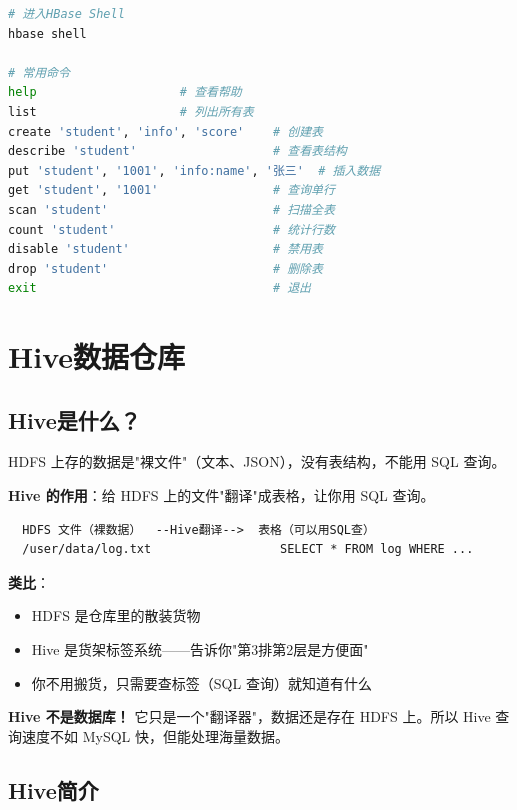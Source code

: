 \documentclass[12pt,a4paper]{article}
\begin{document}
\begin{lstlisting}[language=bash]
# 进入HBase Shell
hbase shell

# 常用命令
help                    # 查看帮助
list                    # 列出所有表
create 'student', 'info', 'score'    # 创建表
describe 'student'                   # 查看表结构
put 'student', '1001', 'info:name', '张三'  # 插入数据
get 'student', '1001'                # 查询单行
scan 'student'                       # 扫描全表
count 'student'                      # 统计行数
disable 'student'                    # 禁用表
drop 'student'                       # 删除表
exit                                 # 退出
\end{lstlisting}

\section{Hive数据仓库}

\subsection{Hive是什么？}

\begin{theorybox}
HDFS 上存的数据是"裸文件"（文本、JSON），没有表结构，不能用 SQL 查询。

\textbf{Hive 的作用}：给 HDFS 上的文件"翻译"成表格，让你用 SQL 查询。

\begin{verbatim}
  HDFS 文件（裸数据）  --Hive翻译-->  表格（可以用SQL查）
  /user/data/log.txt                  SELECT * FROM log WHERE ...
\end{verbatim}

\textbf{类比}：
\begin{itemize}
    \item HDFS 是仓库里的散装货物
    \item Hive 是货架标签系统——告诉你"第3排第2层是方便面"
    \item 你不用搬货，只需要查标签（SQL 查询）就知道有什么
\end{itemize}

\textbf{Hive 不是数据库！} 它只是一个"翻译器"，数据还是存在 HDFS 上。所以 Hive 查询速度不如 MySQL 快，但能处理海量数据。
\end{theorybox}

\subsection{Hive简介}
\end{document}
